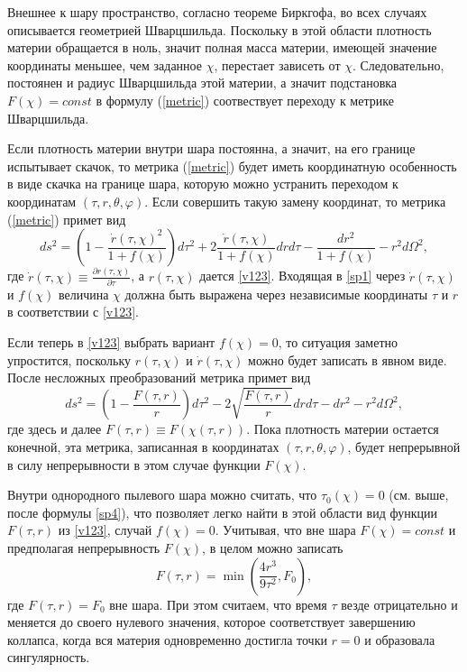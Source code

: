\documentclass[12pt]{article}
\newcommand{\bq}{\begin{equation}}
\newcommand{\eq}{\end{equation}}
\begin{document}
Внешнее к шару пространство, согласно теореме Биркгофа, во всех случаях описывается геометрией Шварцшильда.
Поскольку в этой области плотность материи обращается в ноль, значит полная масса материи, имеющей значение координаты меньшее, чем заданное $\chi$,
перестает зависеть от $\chi$. Следовательно, постоянен и радиус Шварцшильда этой материи, а значит подстановка $F(\chi)=const$ в формулу (\ref{metric})
соотвествует переходу к метрике Шварцшильда.

Если плотность материи внутри шара постоянна, а значит, на его границе испытывает скачок,
то метрика (\ref{metric}) будет иметь координатную особенность в виде скачка на границе шара, которую можно устранить
переходом к координатам $(\tau, r, \theta, \varphi)$.
Если совершить такую замену координат, то метрика (\ref{metric}) примет вид
\bq\label{sp1}
	d s^2 = \left( 1- \frac{\dot{r}(\tau, \chi)^2}{1+f(\chi)}\right) d \tau^2 + 2\frac{\dot{r}(\tau, \chi)}{1+f(\chi)}dr d\tau - \frac{dr^2}{1+f(\chi)} - r^2 d\Omega^2,
\eq
где $\dot{r}(\tau, \chi) \equiv \frac{\partial r(\tau, \chi)}{\partial \tau}$, а $r(\tau, \chi)$ дается \eqref{v123}.
Входящая в \eqref{sp1} через $\dot{r}(\tau, \chi)$ и $f(\chi)$ величина $\chi$
должна быть выражена через независимые координаты $\tau$ и $r$ в соответствии с \eqref{v123}.

Если теперь в \eqref{v123} выбрать вариант $f(\chi)=0$, то ситуация заметно упростится, поскольку
 $r(\tau, \chi)$ и $\dot{r}(\tau, \chi)$ можно будет записать в явном виде. После несложных преобразований метрика примет вид
\bq
\label{metric2}
	d s^2 = \left(1-\frac{F(\tau, r)}{r} \right)d\tau^2 - 2 \sqrt{\frac{F(\tau, r)}{r}}dr d\tau  - dr^2 - r^2 d\Omega^2,
\eq
где здесь и далее $F(\tau, r)\equiv F(\chi(\tau, r))$.
Пока плотность материи остается конечной, эта метрика, записанная в координатах $(\tau, r, \theta, \varphi)$, будет непрерывной
в силу непрерывности в этом случае функции $F(\chi)$.

Внутри однородного пылевого шара можно считать, что $\tau_0(\chi)=0$ (см. выше, после формулы \eqref{sp4}), что позволяет легко
найти в этой области вид функции $F(\tau, r)$ из \eqref{v123}, случай $f(\chi)=0$. Учитывая, что вне шара $F(\chi)=const$ и предполагая
непрерывность $F(\chi)$, в целом можно записать
\bq\label{sp2}
	F(\tau, r) = \min{ \left( \frac{4r^3}{9\tau^2}, F_0 \right) },
\eq
где $F(\tau, r)=F_0$ вне шара. При этом считаем, что время $\tau$ везде отрицательно и меняется до своего нулевого значения,
которое соответствует завершению коллапса, когда вся материя одновременно достигла точки $r=0$ и образовала сингулярность.
\end{document}
